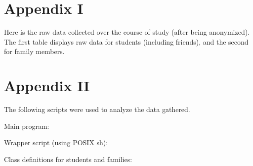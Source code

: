 \documentclass[12pt]{report}
\begin{document}
\chapter*{Appendix I}
Here is the raw data collected over the course of study (after being anonymized). The first table displays raw data for students (including friends), and the second for family members.




\chapter*{Appendix II}
The following scripts were used to analyze the data gathered.

Main program:



Wrapper script (using POSIX sh):



Class definitions for students and families:


\end{document}
